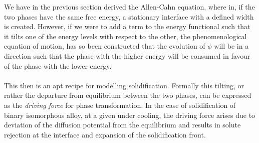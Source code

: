 \documentclass[12pt,a4paper]{report}
\begin{document}
We have in the previous section derived the Allen-Cahn 
equation, where in, if the two phases have the same 
free energy, a stationary interface with a defined width 
is created. However, if we were to add a term to the energy
functional such that it tilts one of the energy levels with respect to the other, the phenomenological equation of motion, has so been constructed that the evolution of $\phi$ will be in a direction such that the phase with the higher energy will be consumed in favour of the phase with the lower energy.\\
\\
This then is an apt recipe for modelling solidification. Formally this tilting, or rather the departure from equilibrium between the two phases, can be expressed as the \textit{driving force} for phase transformation. In the case of solidification of binary isomorphous alloy, at a given under cooling, the driving force arises due to deviation of the diffusion potential from the equilibrium and results in solute rejection at the interface and expansion of the solidification front.\\
\\
\end{document}
